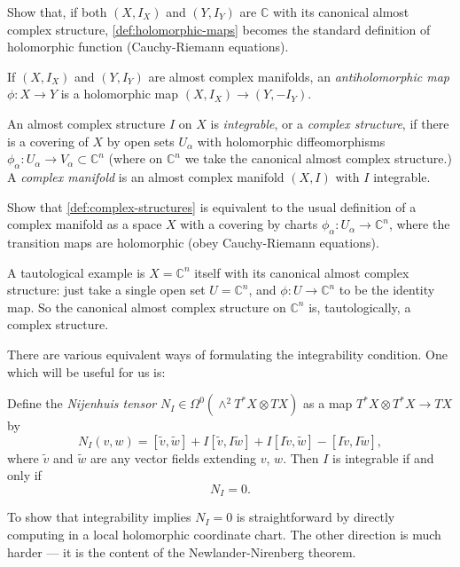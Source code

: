\documentclass[12pt,letterpaper,reqno]{article}
\numberwithin{equation}{section}
\newcommand{\C}{\ensuremath{\mathbb C}}
\newcommand{\ti}[1]{\textit{#1}}
\begin{document}
\begin{exercise} Show that, if both $(X,I_X)$ and $(Y,I_Y)$ are $\C$ with its canonical
almost complex structure, \autoref{def:holomorphic-maps} becomes the standard
definition of holomorphic function (Cauchy-Riemann equations).
\end{exercise}

\begin{defn} \label{def:antiholomorphic-maps} If $(X,I_X)$ and $(Y,I_Y)$ are almost
complex manifolds, an \ti{antiholomorphic map} $\phi: X \to Y$
is a holomorphic map $(X,I_X) \to (Y,-I_Y)$.
\end{defn}

\begin{defn} \label{def:complex-structures} An almost complex structure $I$ on $X$ is \ti{integrable},
or a \ti{complex structure}, if there is a covering of $X$ by open sets $U_\alpha$ with holomorphic diffeomorphisms $\phi_\alpha: U_\alpha \to V_\alpha \subset \C^n$ (where on $\C^n$ we take the
canonical almost complex structure.) A \ti{complex manifold} is an almost complex manifold $(X,I)$ with $I$ integrable.
\end{defn}

\begin{exercise} Show that \autoref{def:complex-structures} is equivalent to the usual definition of a complex manifold as a space
$X$ with a covering by charts $\phi_\alpha: U_\alpha \to \C^n$, where the transition maps are holomorphic (obey Cauchy-Riemann equations).
\end{exercise}

\begin{example}[Complex structure on $\C^n$] A tautological example is $X = \C^n$ itself with its
canonical almost complex structure: just take a single open set $U = \C^n$, and $\phi: U \to \C^n$ to be the identity map. So the canonical almost complex structure on $\C^n$ is, tautologically, a
complex structure.
\end{example}

There are various equivalent ways of formulating the integrability condition. One which will be useful for us is:
\begin{prop} Define the \ti{Nijenhuis tensor} $N_I \in \Omega^0(\wedge^2 T^*X \otimes TX)$ as a map
$T^*X \otimes T^*X \to TX$ by
\begin{equation}
N_I(v,w) = [\tilde v,\tilde w] + I[\tilde v,I \tilde w] + I[I \tilde v, \tilde w] - [I\tilde v,I\tilde w],
\end{equation}
where $\tilde v$ and $\tilde w$ are any vector fields extending $v$, $w$.
Then $I$ is integrable if and only if
\begin{equation}
N_I = 0.
\end{equation}
\end{prop}
\begin{pf} To show that integrability implies $N_I = 0$ is straightforward
by directly computing in a local holomorphic coordinate
chart. The other direction
is much harder --- it is the content of the Newlander-Nirenberg theorem.
\end{pf}
\end{document}
